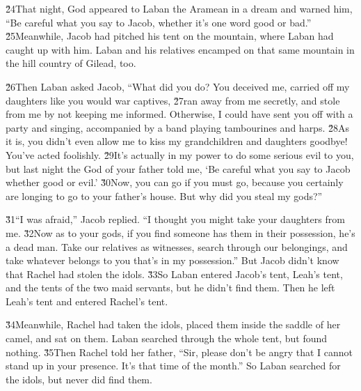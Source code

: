 \v{24}That night, God appeared to Laban the Aramean in a dream and warned him, ``Be careful what you say to Jacob, whether it's one word good or bad.'' \v{25}Meanwhile, Jacob had pitched his tent on the mountain, where Laban had caught up with him. Laban and his relatives encamped on that same mountain in the hill country of Gilead, too.

\v{26}Then Laban asked Jacob, ``What did you do? You deceived me, carried off my daughters like you would war captives, \v{27}ran away from me secretly, and stole from me by not keeping me informed. Otherwise, I could have sent you off with a party and singing, accompanied by a band playing tambourines and harps. \v{28}As it is, you didn't even allow me to kiss my grandchildren and daughters goodbye! You've acted foolishly. \v{29}It's actually in my power to do some serious evil to you, but last night the God of your father told me, `Be careful what you say to Jacob whether good or evil.' \v{30}Now, you can go if you must go, because you certainly are longing to go to your father's house. But why did you steal my gods?''

\v{31}``I was afraid,'' Jacob replied. ``I thought you might take your daughters from me. \v{32}Now as to your gods, if you find someone has them in their possession, he's a dead man. Take our relatives as witnesses, search through our belongings, and take whatever belongs to you that's in my possession.'' But Jacob didn't know that Rachel had stolen the idols. \v{33}So Laban entered Jacob's tent, Leah's tent, and the tents of the two maid servants, but he didn't find them. Then he left Leah's tent and entered Rachel's tent.

\v{34}Meanwhile, Rachel had taken the idols, placed them inside the saddle of her camel, and sat on them. Laban searched through the whole tent, but found nothing. \v{35}Then Rachel told her father, ``Sir, please don't be angry that I cannot stand up in your presence. It's that time of the month.'' So Laban searched for the idols, but never did find them.

